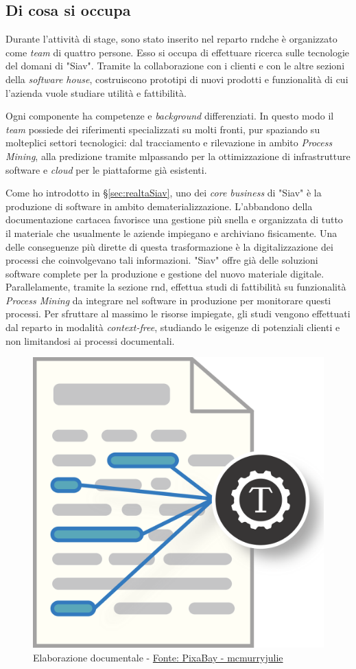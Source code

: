 \subsection{Di cosa si occupa}
\label{subsec:occupazioneRnd}
Durante l'attività di stage, sono stato inserito nel reparto \acrshort{rnd}\glsfirstoccur che è organizzato come \textit{team} di quattro persone. Esso si occupa di effettuare ricerca sulle tecnologie del domani di "Siav". Tramite la collaborazione con i clienti e con le altre sezioni della \textit{software house}, costruiscono prototipi di nuovi prodotti e funzionalità di cui l'azienda vuole studiare utilità e fattibilità.

Ogni componente ha competenze e \textit{background} differenziati. In questo modo il \textit{team} possiede dei riferimenti specializzati su molti fronti, pur spaziando su molteplici settori tecnologici: dal tracciamento e rilevazione in ambito \textit{Process Mining}, alla predizione tramite \acrlong{ml}\glsfirstoccur passando per la ottimizzazione di infrastrutture software e \textit{cloud} per le piattaforme già esistenti.

Come ho introdotto in \S \ref{sec:realtaSiav}, uno dei \textit{core business} di "Siav" è la produzione di software in ambito dematerializzazione. L'abbandono della documentazione cartacea favorisce una gestione più snella e organizzata di tutto il materiale che usualmente le aziende impiegano e archiviano fisicamente. Una delle conseguenze più dirette di questa trasformazione è la digitalizzazione dei processi che coinvolgevano tali informazioni. "Siav" offre già delle soluzioni software complete per la produzione e gestione del nuovo materiale digitale. Parallelamente, tramite la sezione \acrshort{rnd}, effettua studi di fattibilità su funzionalità \textit{Process Mining} da integrare nel software in produzione per monitorare questi processi. Per sfruttare al massimo le risorse impiegate, gli studi vengono effettuati dal reparto in modalità \textit{context-free}, studiando le esigenze di potenziali clienti e non limitandosi ai processi documentali.
\begin{figure}[H] 
    \centering 
    \includegraphics[width=0.45\columnwidth]{immagini/text-mining.png} 
    \caption{Elaborazione documentale - \href{https://pixabay.com/it/users/mcmurryjulie-2375405/?utm_source=link-attribution&amp;utm_medium=referral&amp;utm_campaign=image&amp;utm_content=1476780}{Fonte: PixaBay - mcmurryjulie}}
    \label{fig:elaborazioneDocumentale}
\end{figure}
\newpage
